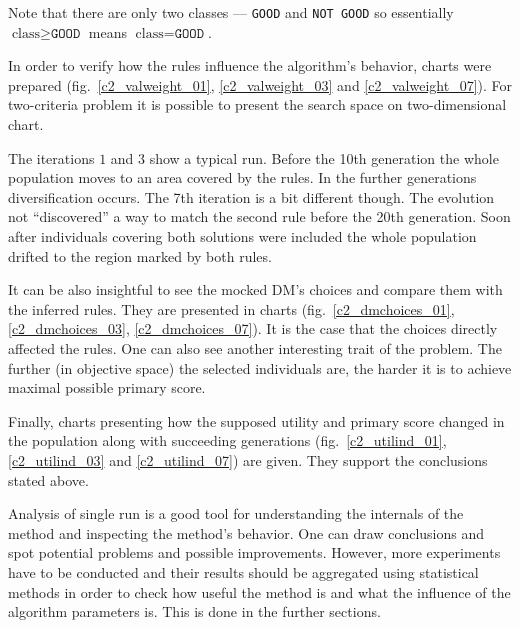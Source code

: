 Note that there are only two classes --- \texttt{GOOD} and \texttt{NOT GOOD}
so essentially $\text{class} \ge \texttt{GOOD}$ means $\text{class} =
\texttt{GOOD}$.

In order to verify how the rules influence the algorithm's behavior, charts
were prepared (fig.~\ref{c2_valweight_01}, \ref{c2_valweight_03} and
\ref{c2_valweight_07}). For two-criteria problem it is possible to present the
search space on two-dimensional chart.

The iterations $1$ and $3$ show a typical run. Before the 10th generation the
whole population moves to an area covered by the rules. In the further
generations diversification occurs. The 7th iteration is a bit different
though. The evolution not ``discovered'' a way to match the second rule before
the 20th generation. Soon after individuals covering both solutions were
included the whole population drifted to the region marked by both rules.

It can be also insightful to see the mocked DM's choices and compare them with
the inferred rules. They are presented in charts (fig.~\ref{c2_dmchoices_01},
\ref{c2_dmchoices_03}, \ref{c2_dmchoices_07}). It is the case that the choices
directly affected the rules. One can also see another interesting trait of the
problem. The further (in objective space) the selected individuals are, the
harder it is to achieve maximal possible primary score.

Finally, charts presenting how the supposed utility and primary score changed
in the population along with succeeding generations (fig.~\ref{c2_utilind_01},
\ref{c2_utilind_03} and \ref{c2_utilind_07}) are given. They support the
conclusions stated above.

Analysis of single run is a good tool for understanding the internals of the
method and inspecting the method's behavior. One can draw conclusions and spot
potential problems and possible improvements. However, more experiments have to
be conducted and their results should be aggregated using statistical methods
in order to check how useful the method is and what the influence of the
algorithm parameters is. This is done in the further sections.

